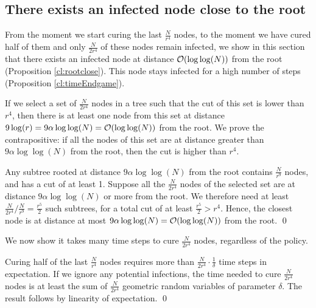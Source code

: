 \subsection{There exists an infected node close to the root}  \label{sec:step2}

From the moment we start curing the last $\frac{N}{r^4}$ nodes, to the moment we have cured half of them and only $\frac{N}{2r^4}$ of these nodes remain infected, we show in this section that there exists an infected node at distance $\mathcal{O}(\log\log(N))$ from the root (Proposition \ref{cl:rootclose}). This node stays infected for a high number of steps (Proposition \ref{cl:timeEndgame}). 

\begin{proposition} \label{cl:rootclose} 
If we select a set of $\frac{N}{2r^4}$ nodes in a tree such that the cut of this set is lower than $r^4$, then there is at least one node from this set at distance  $9\log(r) = 9\alpha\log\log(N) = \mathcal{O}(\log\log(N))$ from the root.
\proof  We prove the contrapositive: if all the nodes of this set are at distance greater than $9\alpha\log\log(N)$ from the root, then the cut is higher than $r^4$.

Any subtree rooted at distance $9\alpha\log\log(N)$ from the root contains $\frac{N}{r^9}$ nodes, and has a cut of at least 1. Suppose all the $\frac{N}{2r^4}$ nodes of the selected set are at distance $9\alpha\log\log(N)$ or more from the root. We therefore need at least $\frac{N}{2r^4}/\frac{N}{r^9} = \frac{r^5}{2} $ such subtrees, for a total cut of at least $\frac{r^5}{2} > r^4 $.
Hence, the closest node is at distance at most $9\alpha\log\log(N) = \mathcal{O}(\log\log(N))$ from the root. \qed 
\end{proposition}

We now show it takes many time steps to cure $\frac{N}{2r^4}$ nodes, regardless of the policy.

\begin{proposition} \label{cl:timeEndgame}
Curing half of the last $\frac{N}{r^4}$ nodes requires more than $ \frac{N}{2r^4} \cdot \frac{1}{\delta}$ time steps in expectation.
\proof If we ignore any potential infections, the time needed to cure $\frac{N}{2r^4}$ nodes is at least the sum of $\frac{N}{2r^4}$ geometric random variables of parameter $\delta$. The result follows by linearity of expectation. \qed 
\end{proposition}


